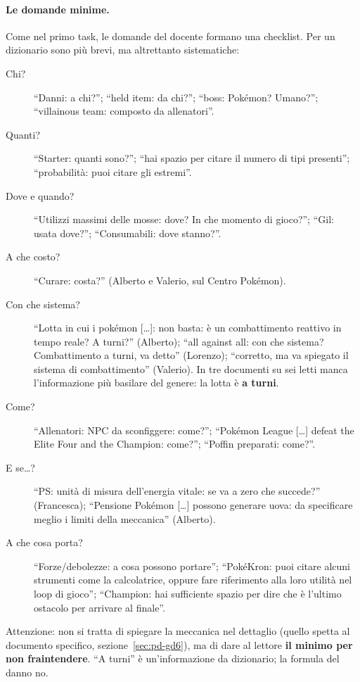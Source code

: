 \paragraph{Le domande minime.} Come nel primo task, le domande del docente
formano una checklist. Per un dizionario sono più brevi, ma altrettanto
sistematiche:
\begin{description}
  \item[Chi?] ``Danni: a chi?''; ``held item: da chi?''; ``boss: Pokémon?
        Umano?''; ``villainous team: composto da allenatori''.
  \item[Quanti?] ``Starter: quanti sono?''; ``hai spazio per citare il numero
        di tipi presenti''; ``probabilità: puoi citare gli estremi''.
  \item[Dove e quando?] ``Utilizzi massimi delle mosse: dove? In che momento
        di gioco?''; ``Gil: usata dove?''; ``Consumabili: dove stanno?''.
  \item[A che costo?] ``Curare: costa?'' (Alberto e Valerio, sul Centro
        Pokémon).
  \item[Con che sistema?] ``Lotta in cui i pokémon [\dots]: non basta: è un
        combattimento reattivo in tempo reale? A turni?'' (Alberto); ``all
        against all: con che sistema? Combattimento a turni, va detto''
        (Lorenzo); ``corretto, ma va spiegato il sistema di combattimento''
        (Valerio). In tre documenti su sei letti manca l'informazione più
        basilare del genere: la lotta è \textbf{a turni}.
  \item[Come?] ``Allenatori: NPC da sconfiggere: come?''; ``Pokémon League
        [\dots] defeat the Elite Four and the Champion: come?''; ``Poffin
        preparati: come?''.
  \item[E se\dots?] ``PS: unità di misura dell'energia vitale: se va a zero
        che succede?'' (Francesca); ``Pensione Pokémon [\dots] possono
        generare uova: da specificare meglio i limiti della meccanica''
        (Alberto).
  \item[A che cosa porta?] ``Forze/debolezze: a cosa possono portare'';
        ``PokéKron: puoi citare alcuni strumenti come la calcolatrice, oppure
        fare riferimento alla loro utilità nel loop di gioco''; ``Champion:
        hai sufficiente spazio per dire che è l'ultimo ostacolo per arrivare
        al finale''.
\end{description}
Attenzione: non si tratta di spiegare la meccanica nel dettaglio (quello
spetta al documento specifico, sezione~\ref{sec:pd-gd6}), ma di dare al
lettore \textbf{il minimo per non fraintendere}. ``A turni'' è un'informazione
da dizionario; la formula del danno no.

